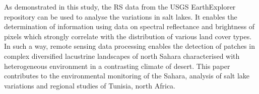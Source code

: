 \documentclass[land,article,accept,pdftex,moreauthors]{Definitions/mdpi}
\begin{document}
As demonstrated in this study, the RS data from the USGS EarthExplorer repository can be used to analyse the variations in salt lakes. It enables the determination of information using data on spectral reflectance and brightness of pixels which strongly correlate with the distribution of various land cover types. In such a way, remote sensing data processing enables the detection of patches in complex diversified lacustrine landscapes of north Sahara characterised with heterogeneous environment in {a} contrasting climate of desert. This paper contributes to the environmental monitoring of the Sahara, analysis of salt lake variations and regional studies of Tunisia, north Africa.
\vspace{6pt}






\end{document}
